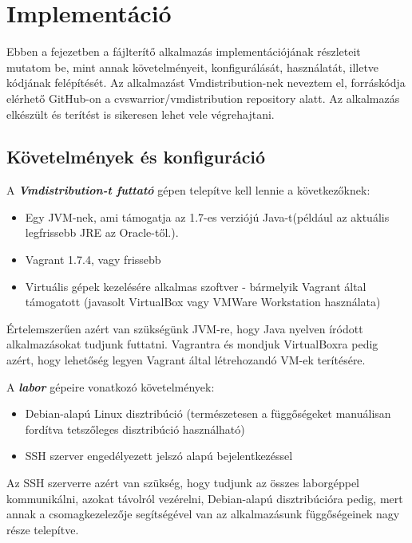 \chapter{Implementáció}
\label{chp:implementation}
Ebben a fejezetben a fájlterítő alkalmazás implementációjának részleteit mutatom be, mint annak követelményeit, konfigurálását, használatát, illetve kódjának felépítését.
Az alkalmazást Vmdistribution-nek neveztem el, forráskódja elérhető GitHub-on a cvswarrior/vmdistribution repository alatt\cite{vmdistribution}. Az alkalmazás elkészült és terítést is sikeresen lehet vele végrehajtani.

\section{Követelmények és konfiguráció}

A \textit{\textbf{Vmdistribution-t futtató}} gépen telepítve kell lennie a következőknek:
\begin{itemize}
  \item Egy JVM-nek\cite{stark2001java}, ami támogatja az 1.7-es verziójú Java-t(például az aktuális legfrissebb JRE az Oracle-től\cite{oraclejre}.).
  \item Vagrant 1.7.4, vagy frissebb
  \item Virtuális gépek kezelésére alkalmas szoftver - bármelyik Vagrant által támogatott\cite{vagrantproviders} (javasolt VirtualBox vagy VMWare Workstation használata)
\end{itemize}
Értelemszerűen azért van szükségünk JVM-re, hogy Java nyelven íródott alkalmazásokat tudjunk futtatni. Vagrantra és mondjuk VirtualBoxra pedig azért, hogy lehetőség legyen Vagrant által létrehozandó VM-ek terítésére.

A \textit{\textbf{labor}} gépeire vonatkozó követelmények:
\begin{itemize}
  \item Debian-alapú Linux disztribúció (természetesen a függőségeket manuálisan fordítva tetszőleges disztribúció használható)
  \item SSH szerver engedélyezett jelszó alapú bejelentkezéssel
\end{itemize}
Az SSH szerverre azért van szükség, hogy tudjunk az összes laborgéppel kommunikálni, azokat távolról vezérelni, Debian-alapú disztribúcióra pedig, mert annak a csomagkezelezője segítségével van az alkalmazásunk függőségeinek nagy része telepítve.

